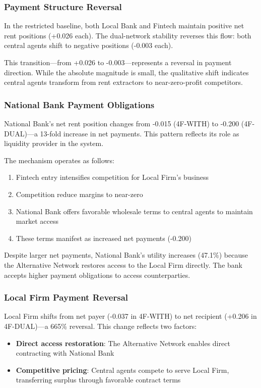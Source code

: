 \subsubsection{Payment Structure Reversal}

In the restricted baseline, both Local Bank and Fintech maintain positive net rent positions (+0.026 each). The dual-network stability reverses this flow: both central agents shift to negative positions (-0.003 each).

This transition—from +0.026 to -0.003—represents a reversal in payment direction. While the absolute magnitude is small, the qualitative shift indicates central agents transform from rent extractors to near-zero-profit competitors.

\subsubsection{National Bank Payment Obligations}

National Bank's net rent position changes from -0.015 (4F-WITH) to -0.200 (4F-DUAL)—a 13-fold increase in net payments. This pattern reflects its role as liquidity provider in the system.

The mechanism operates as follows:
\begin{enumerate}
    \item Fintech entry intensifies competition for Local Firm's business
    \item Competition reduce margins to near-zero
    \item National Bank offers favorable wholesale terms to central agents to maintain market access
    \item These terms manifest as increased net payments (-0.200)
\end{enumerate}

Despite larger net payments, National Bank's utility increases (47.1\%) because the Alternative Network restores access to the Local Firm directly. The bank accepts higher payment obligations to access counterparties.

\subsubsection{Local Firm Payment Reversal}

Local Firm shifts from net payer (-0.037 in 4F-WITH) to net recipient (+0.206 in 4F-DUAL)—a 665\% reversal. This change reflects two factors:

\begin{itemize}
    \item \textbf{Direct access restoration}: The Alternative Network enables direct contracting with National Bank
    
    \item \textbf{Competitive pricing}: Central agents compete to serve Local Firm, transferring surplus through favorable contract terms
\end{itemize}

